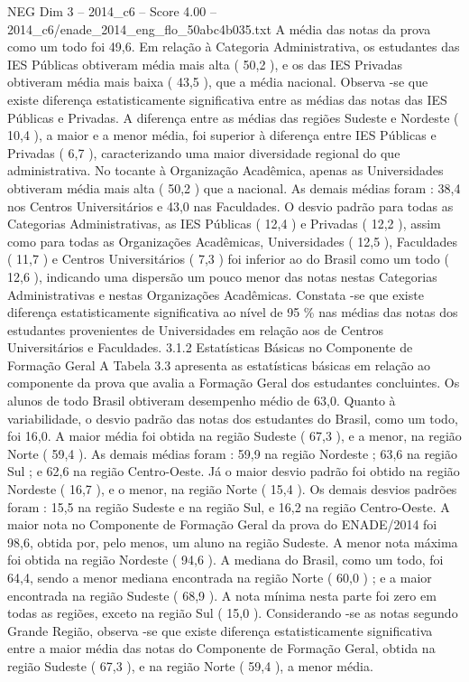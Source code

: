 \begin{textsample}{NEG Dim 3 – 2014\_c6 – Score 4.00 – 2014\_c6/enade\_2014\_eng\_flo\_50abc4b035.txt}
A média das notas da prova como um todo foi 49,6.
Em relação à Categoria Administrativa, os estudantes das IES Públicas obtiveram média mais alta ( 50,2 ), e os das IES Privadas obtiveram média mais baixa ( 43,5 ), que a média nacional.
Observa -se que existe diferença estatisticamente significativa entre as médias das notas das IES Públicas e Privadas.
A diferença entre as médias das regiões Sudeste e Nordeste ( 10,4 ), a maior e a menor média, foi superior à diferença entre IES Públicas e Privadas ( 6,7 ), caracterizando uma maior diversidade regional do que administrativa.
No tocante à Organização Acadêmica, apenas as Universidades obtiveram média mais alta ( 50,2 ) que a nacional.
As demais médias foram : 38,4 nos Centros Universitários e 43,0 nas Faculdades.
O desvio padrão para todas as Categorias Administrativas, as IES Públicas ( 12,4 ) e Privadas ( 12,2 ), assim como para todas as Organizações Acadêmicas, Universidades ( 12,5 ), Faculdades ( 11,7 ) e Centros Universitários ( 7,3 ) foi inferior ao do Brasil como um todo ( 12,6 ), indicando uma dispersão um pouco menor das notas nestas Categorias Administrativas e nestas Organizações Acadêmicas.
Constata -se que existe diferença estatisticamente significativa ao nível de 95 \% nas médias das notas dos estudantes provenientes de Universidades em relação aos de Centros Universitários e Faculdades. 3.1.2 Estatísticas Básicas no Componente de Formação Geral A Tabela 3.3 apresenta as estatísticas básicas em relação ao componente da prova que avalia a Formação Geral dos estudantes concluintes.
Os alunos de todo Brasil obtiveram desempenho médio de 63,0.
Quanto à variabilidade, o desvio padrão das notas dos estudantes do Brasil, como um todo, foi 16,0.
A maior média foi obtida na região Sudeste ( 67,3 ), e a menor, na região Norte ( 59,4 ).
As demais médias foram : 59,9 na região Nordeste ; 63,6 na região Sul ; e 62,6 na região Centro-Oeste.
Já o maior desvio padrão foi obtido na região Nordeste ( 16,7 ), e o menor, na região Norte ( 15,4 ).
Os demais desvios padrões foram : 15,5 na região Sudeste e na região Sul, e 16,2 na região Centro-Oeste.
A maior nota no Componente de Formação Geral da prova do ENADE/2014 foi 98,6, obtida por, pelo menos, um aluno na região Sudeste.
A menor nota máxima foi obtida na região Nordeste ( 94,6 ).
A mediana do Brasil, como um todo, foi 64,4, sendo a menor mediana encontrada na região Norte ( 60,0 ) ; e a maior encontrada na região Sudeste ( 68,9 ).
A nota mínima nesta parte foi zero em todas as regiões, exceto na região Sul ( 15,0 ).
Considerando -se as notas segundo Grande Região, observa -se que existe diferença estatisticamente significativa entre a maior média das notas do Componente de Formação Geral, obtida na região Sudeste ( 67,3 ), e na região Norte ( 59,4 ), a menor média.

\end{textsample}
